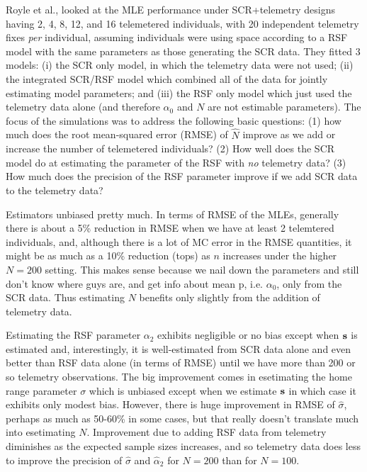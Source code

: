 Royle et al., looked at the MLE performance under SCR+telemetry
designs having 
 2, 4, 8, 12, and 16 telemetered individuals, with 20 
independent telemetry fixes {\it per} individual, assuming
individuals were using space according to a RSF model with the same
parameters as those generating the SCR data. 
They fitted 3 models: (i)
the SCR only model, in which the telemetry data were not used; (ii)
the integrated SCR/RSF model which combined all of the data for
jointly estimating model parameters; and (iii) the RSF only model
which just used the telemetry data alone (and therefore $\alpha_{0}$
and $N$ are not estimable parameters).  The focus of the simulations
was to address the following basic questions: (1) how much does the
root mean-squared error (RMSE) of $\hat{N}$ improve as we add or
increase the number of telemetered individuals?  (2) How well does the
SCR model do at estimating the parameter of the RSF with {\it no}
telemetry data?  (3) How much does the precision of the RSF parameter
improve if we add SCR data to the telemetry data?

Estimators unbiased pretty much.
In terms of RMSE of the MLEs, generally there is about a 5\% reduction
in RMSE when we have at least 2 telemtered individuals,
and, although
there is a lot of MC error in the RMSE quantities, it might be as much
as a 10\% reduction (tops) as $n$ increases under the higher $N=200$ setting. This makes sense because
we nail down the parameters and still don't know where guys are, and
get info about mean p, i.e. $\alpha_{0}$, only from the SCR data. Thus
estimating $N$  benefits only slightly from the addition of telemetry
data.

Estimating the RSF parameter $\alpha_{2}$ exhibits negligible or no
bias except when ${\bf s}$ is estimated and, interestingly, it is
well-estimated from SCR data alone and even better than RSF data alone
(in terms of RMSE) until we have more than 200 or so telemetry
observations.  The big improvement comes in esetimating the home range
parameter $\sigma$ which is unbiased except when we estimate ${\bf s}$
in which case it exhibits only modest bias.  However, there is huge
improvement in RMSE of $\hat{\sigma}$, perhaps as much as 50-60\% in
some cases, but that really doesn't translate much into esetimating
$N$.  Improvement due to adding RSF data from telemetry diminishes as
the expected sample sizes increases, and so telemetry data does less
to improve the precision of
$\hat{\sigma}$ and $\hat{\alpha}_{2}$
for $N=200$ than for $N=100$.









